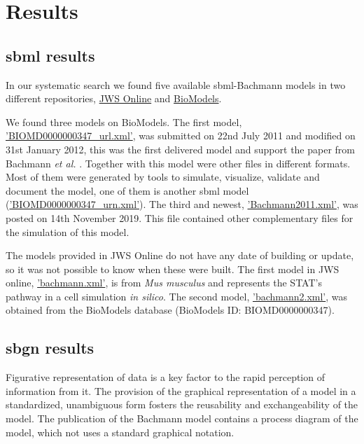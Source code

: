\section*{Results} \label{sec:resuslt}
\subsection*{\acf{sbml} results}
In our systematic search we found five available \ac{sbml}-Bachmann models in two different repositories, \hyperlink{https://www.systemsmedicine.net/posts/jws-online-biological-systems-modelling}{JWS Online} and \hyperlink{https://www.ebi.ac.uk/biomodels/}{BioModels}.

We found three models on BioModels. The first model, \hyperlink{https://www.ebi.ac.uk/biomodels/model/download/BIOMD0000000347.2?filename=BIOMD0000000347_url.xml}{'BIOMD0000000347\_url.xml'}, was submitted on 22nd July 2011 and modified on 31st January 2012, this was the first delivered model and support the paper from Bachmann \textit{et al.} \cite{bachmannmodel}. Together with this model were other files in different formats. Most of them were generated by tools to simulate, visualize, validate and document the model, one of them is another \ac{sbml} model (\hyperlink{https://www.ebi.ac.uk/biomodels/model/download/BIOMD0000000347.2?filename=BIOMD0000000347_url.xml}{'BIOMD0000000347\_urn.xml'}). The third and newest, \hyperlink{https://www.ebi.ac.uk/biomodels/model/download/BIOMD0000000861.2?filename=Bachmann2011.xml}{'Bachmann2011.xml'}, was posted on 14th November 2019. This file contained other complementary files for the simulation of this model.  

The models provided in JWS Online do not have any date of building or update, so it was not possible to know when these were built. The first model in JWS online, \hyperlink{https://jjj.bio.vu.nl/models/bachmann/sbml/?download=1}{'bachmann.xml'}, is from \textit{Mus musculus} and represents the STAT's pathway in a cell simulation \textit{in silico}. The second model, \hyperlink{https://jjj.bio.vu.nl/models/bachmann2/sbml/?download=1}{'bachmann2.xml'}, was obtained from the BioModels database (BioModels ID: BIOMD0000000347).

\subsection*{\acf{sbgn} results}
Figurative representation of data is a key factor to the rapid perception of information from it. The provision of the graphical representation of a model in a standardized, unambiguous form fosters the reusability and exchangeability of the model. The publication of the Bachmann model contains a process diagram of the model, which not uses a standard graphical notation.

